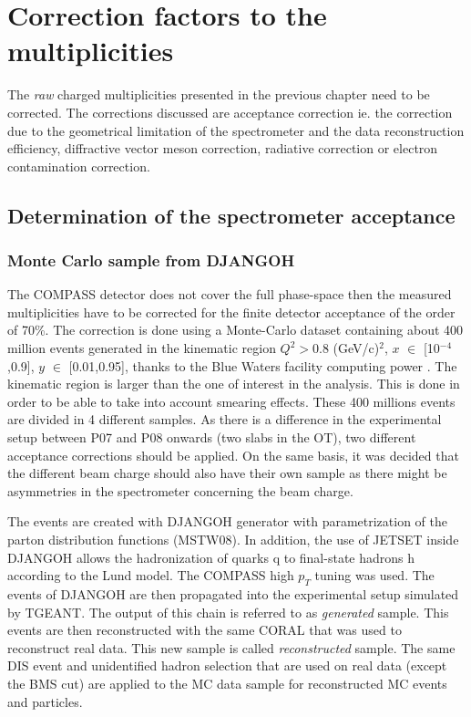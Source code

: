 
\chapter{Correction factors to the multiplicities} %

\label{ch:CF} %


The \textit{raw} charged multiplicities presented in the previous chapter need to be corrected. The corrections discussed are acceptance correction ie. the correction due to the geometrical limitation of the spectrometer and the data reconstruction efficiency, diffractive vector meson correction, radiative correction or electron contamination correction.

\section{Determination of the spectrometer acceptance}

\subsection{Monte Carlo sample from DJANGOH}

The COMPASS detector does not cover the full phase-space then the measured multiplicities have
to be corrected for the finite detector acceptance of the order of 70\%. The correction is
done using a Monte-Carlo dataset containing about 400 million events generated in the kinematic
region $Q^2 > 0.8$ (GeV/c)$^2$, $x$ $\in$ [10$^{-4}$,0.9], $y$ $\in$ [0.01,0.95], thanks to the Blue Waters facility computing power \cite{}. The kinematic region is larger than the one of interest in the analysis. This is done in order to be able to take into account smearing effects. These 400 millions events are divided in 4 different samples. As there is a difference in the experimental setup between P07 and P08 onwards (two slabs in the OT), two different acceptance corrections should be applied. On the same basis, it was decided that the different beam charge should also have their own sample as there might be asymmetries in the spectrometer concerning the beam charge.

The events are created with DJANGOH generator with parametrization of the parton distribution functions (MSTW08). In addition, the use of JETSET inside DJANGOH allows the hadronization of quarks q to final-state hadrons h according to the Lund model. The COMPASS high $p_T$ tuning was used. The events of DJANGOH are then propagated into the experimental setup simulated by TGEANT. The output of this chain is referred to as \textit{generated} sample. This events are then reconstructed with the same CORAL that was used to reconstruct real data. This new sample is called \textit{reconstructed} sample. The same DIS event and unidentified hadron selection that are used on real data (except the BMS cut) are applied to the MC data sample for reconstructed MC events and particles.

